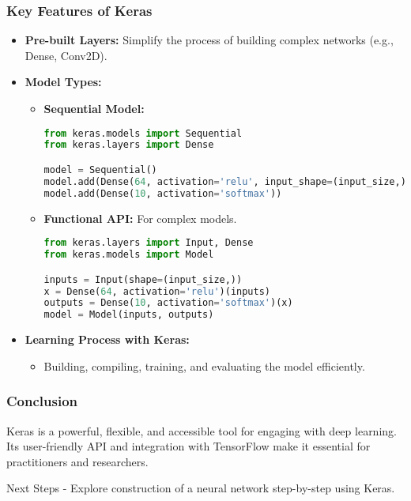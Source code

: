 \documentclass[aspectratio=169]{beamer}
\begin{document}
\begin{frame}[fragile]
    \frametitle{Key Features of Keras}
    \begin{itemize}
        \item \textbf{Pre-built Layers:} Simplify the process of building complex networks (e.g., Dense, Conv2D).
        \item \textbf{Model Types:}
        \begin{itemize}
            \item \textbf{Sequential Model:} 
            \begin{lstlisting}[language=Python]
from keras.models import Sequential
from keras.layers import Dense

model = Sequential()
model.add(Dense(64, activation='relu', input_shape=(input_size,)))
model.add(Dense(10, activation='softmax'))
            \end{lstlisting}
            \item \textbf{Functional API:} For complex models.
            \begin{lstlisting}[language=Python]
from keras.layers import Input, Dense
from keras.models import Model

inputs = Input(shape=(input_size,))
x = Dense(64, activation='relu')(inputs)
outputs = Dense(10, activation='softmax')(x)
model = Model(inputs, outputs)
            \end{lstlisting}
        \end{itemize}
        \item \textbf{Learning Process with Keras:}
        \begin{itemize}
            \item Building, compiling, training, and evaluating the model efficiently.
        \end{itemize}
    \end{itemize}
\end{frame}

\begin{frame}[fragile]
    \frametitle{Conclusion}
    Keras is a powerful, flexible, and accessible tool for engaging with deep learning. Its user-friendly API and integration with TensorFlow make it essential for practitioners and researchers. 
    \begin{block}{Next Steps}
        - Explore construction of a neural network step-by-step using Keras.
    \end{block}
\end{frame}
\end{document}
